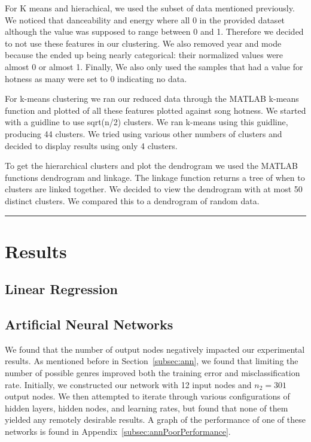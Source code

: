 \documentclass[12pt]{article}
\newcommand{\horizontalLine}{
	\begin{center}
		\hrule width 1.0\textwidth
	\end{center}
}
\begin{document}
For K means and hierachical, we used the subset of data mentioned previously. We noticed that danceability and energy where all 0 in the provided dataset although the value was supposed to range between 0 and 1. Therefore we decided to not use these features in our clustering. We also removed year and mode because the ended up being nearly categorical: their normalized values were almost 0 or almost 1. Finally, We also only used the samples that had a value for hotness as many were set to 0 indicating no data. 

For k-means clustering we ran our reduced data through the MATLAB k-means function and plotted of all these features plotted against song hotness. We started with a guidline to use sqrt(n/2) clusters. We ran k-means using this guidline, producing 44 clusters. We tried using various other numbers of clusters and decided to display results using only 4 clusters.

To get the hierarchical clusters and plot the dendrogram we used the MATLAB functions dendrogram and linkage. The linkage function returns a tree of when to clusters are linked together. We decided to view the dendrogram with at most 50 distinct clusters. We compared this to a dendrogram of random data.

\horizontalLine
\section{Results}
\label{sec:results}

\subsection{Linear Regression}
\label{subsec:linearRegressionResults}

\subsection{Artificial Neural Networks}
\label{subsec:annResults}
We found that the number of output nodes negatively impacted our experimental results. As mentioned before in Section~\ref{subsec:ann}, we found that limiting the number of possible genres improved both the training error and misclassification rate. Initially, we constructed our network with 12 input nodes and $n_2 = 301$ output nodes. We then attempted to iterate through various configurations of hidden layers, hidden nodes, and learning rates, but found that none of them yielded any remotely desirable results. A graph of the performance of one of these networks is found in Appendix~\ref{subsec:annPoorPerformance}.
\end{document}
